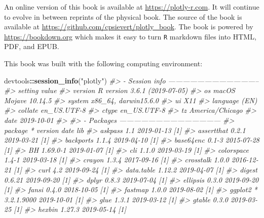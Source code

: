 \documentclass[
  12pt,
]{krantz}
\newenvironment{Shaded}{\begin{snugshade}}{\end{snugshade}}
\newcommand{\CommentTok}[1]{\textcolor[rgb]{0.56,0.35,0.01}{\textit{#1}}}
\newcommand{\KeywordTok}[1]{\textcolor[rgb]{0.13,0.29,0.53}{\textbf{#1}}}
\newcommand{\NormalTok}[1]{#1}
\newcommand{\OperatorTok}[1]{\textcolor[rgb]{0.81,0.36,0.00}{\textbf{#1}}}
\newcommand{\StringTok}[1]{\textcolor[rgb]{0.31,0.60,0.02}{#1}}
\begin{document}
An online version of this book is available at \url{https://plotly-r.com}. It will continue to evolve in between reprints of the physical book. The source of the book is available at \url{https://github.com/cpsievert/plotly_book}. The book is powered by \url{https://bookdown.org} which makes it easy to turn \texttt{R} markdown files into HTML, PDF, and EPUB.

This book was built with the following computing environment:

\begin{Shaded}
\begin{Highlighting}[]
\NormalTok{devtools}\OperatorTok{::}\KeywordTok{session_info}\NormalTok{(}\StringTok{"plotly"}\NormalTok{)}
\CommentTok{#> - Session info --------------------------------------}
\CommentTok{#>  setting  value                       }
\CommentTok{#>  version  R version 3.6.1 (2019-07-05)}
\CommentTok{#>  os       macOS Mojave 10.14.5        }
\CommentTok{#>  system   x86_64, darwin15.6.0        }
\CommentTok{#>  ui       X11                         }
\CommentTok{#>  language (EN)                        }
\CommentTok{#>  collate  en_US.UTF-8                 }
\CommentTok{#>  ctype    en_US.UTF-8                 }
\CommentTok{#>  tz       America/Chicago             }
\CommentTok{#>  date     2019-10-01                  }
\CommentTok{#> }
\CommentTok{#> - Packages ------------------------------------------}
\CommentTok{#>  package      * version    date       lib}
\CommentTok{#>  askpass        1.1        2019-01-13 [1]}
\CommentTok{#>  assertthat     0.2.1      2019-03-21 [1]}
\CommentTok{#>  backports      1.1.4      2019-04-10 [1]}
\CommentTok{#>  base64enc      0.1-3      2015-07-28 [1]}
\CommentTok{#>  BH             1.69.0-1   2019-01-07 [1]}
\CommentTok{#>  cli            1.1.0      2019-03-19 [1]}
\CommentTok{#>  colorspace     1.4-1      2019-03-18 [1]}
\CommentTok{#>  crayon         1.3.4      2017-09-16 [1]}
\CommentTok{#>  crosstalk      1.0.0      2016-12-21 [1]}
\CommentTok{#>  curl           4.2        2019-09-24 [1]}
\CommentTok{#>  data.table     1.12.2     2019-04-07 [1]}
\CommentTok{#>  digest         0.6.21     2019-09-20 [1]}
\CommentTok{#>  dplyr          0.8.3      2019-07-04 [1]}
\CommentTok{#>  ellipsis       0.3.0      2019-09-20 [1]}
\CommentTok{#>  fansi          0.4.0      2018-10-05 [1]}
\CommentTok{#>  fastmap        1.0.0      2019-08-02 [1]}
\CommentTok{#>  ggplot2      * 3.2.1.9000 2019-10-01 [1]}
\CommentTok{#>  glue           1.3.1      2019-03-12 [1]}
\CommentTok{#>  gtable         0.3.0      2019-03-25 [1]}
\CommentTok{#>  hexbin         1.27.3     2019-05-14 [1]}

\end{Highlighting}
\end{Shaded}
\end{document}
